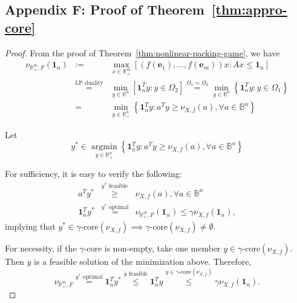 \documentclass[11pt]{article}\usepackage[]{graphicx}\usepackage[]{xcolor}
\DeclareMathOperator*{\argmin}{argmin}
\begin{document}
\subsection{Appendix F: Proof of Theorem~\ref{thm:appro-core}}

\begin{proof} From the proof of Theorem~\ref{thm:nonlinear-packing-game}, we have 
\begin{eqnarray*}
\nu_{\mathbb{R}^m_{+}, F}\left(\mathbf{1}_n\right)&:=&\max\limits_{x\in \mathbb{R}^m_{+}} \left[(f(\mathbf{e}_1),\dots, f(\mathbf{e}_m))x: Ax\le \mathbf{1}_n\right]\\
&\overset{\text{LP duality}}{=}&\min\limits_{y\in\mathbb{R}^{n}} \left[\mathbf{1}_n^Ty: y\in \Omega_2\right]\overset{\Omega_1=\Omega_2}{=}\min\limits_{y\in\mathbb{R}^{n}}\left\{\mathbf{1}_n^Ty: y\in \Omega_1\right\}\\
&=&\min\limits_{y\in\mathbb{R}^{n}_{+}}\left\{\mathbf{1}_n^Ty: a^Ty\ge \nu_{X, f}(a), \forall a\in\mathbb{B}^n\right\}
\end{eqnarray*}



Let 
\[
y^*\in \argmin\limits_{y\in\mathbb{R}^{n}_{+}}\left\{\mathbf{1}_n^Ty: a^Ty\ge \nu_{X, f}(a), \forall a\in\mathbb{B}^n\right\}
\]

For sufficiency, it is easy to verify the following: 
\begin{eqnarray*}
a^Ty^*&\overset{y^* \text{ feasible}}{\ge}& \nu_{X, f}(a), \forall a\in \mathbb{B}^n\\
\mathbf{1}_n^Ty^*&\overset{y^* \text{ optimal}}{=}&\nu_{\mathbb{R}^m_{+}, F}\left(\mathbf{1}_n\right)\le \gamma\nu_{X, f}\left(\mathbf{1}_n\right),
\end{eqnarray*}
implying that $y^*\in \gamma\text{-core}\left(\nu_{X, f}\right)\implies \gamma\text{-core}\left(\nu_{X, f}\right)\ne \emptyset$. 


For necessity, if the $\gamma$-core is non-empty, take one member $y\in \gamma\text{-core}\left(\nu_{X, f}\right)$. Then $y$ is a feasible solution of the minimization above. Therefore, 
\[
\nu_{\mathbb{R}^m_{+}, F}\overset{y^* \text{ optimal}}{=}\mathbf{1}_n^Ty^*\overset{y \text{ feasible}}{\le} \mathbf{1}_n^Ty \overset{y \in \gamma\text{-core}\left(\nu_{X, f}\right)}{\le} \gamma\nu_{X, f}\left(\mathbf{1}_n\right). 
\]


\end{proof}
\end{document}
